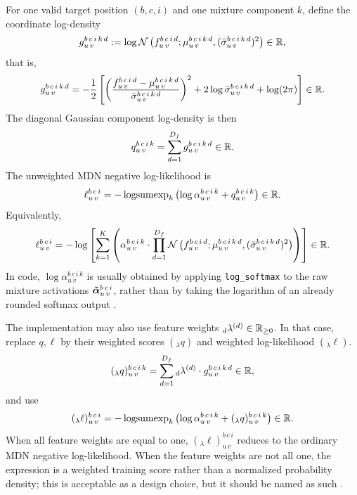 For one valid target position $(b,c,i)$ and one mixture component $k$, define
the coordinate log-density
\[
  g_{u\,v}^{b\,c\,i\,k\,d}
  :=
  \log
  \mathcal{N}
  \left(
    f_{u\,v}^{b\,c\,i\,d};
    \mu_{u\,v}^{b\,c\,i\,k\,d},
    (\bar{\sigma}_{u\,v}^{b\,c\,i\,k\,d})^{2}
  \right)
  \in\mathbb{R},
\]
that is,
\[
  g_{u\,v}^{b\,c\,i\,k\,d}
  =
  -\frac{1}{2}
  \left[
    \left(
      \frac{
        f_{u\,v}^{b\,c\,i\,d}-\mu_{u\,v}^{b\,c\,i\,k\,d}
      }{
        \bar{\sigma}_{u\,v}^{b\,c\,i\,k\,d}
      }
    \right)^{2}
    +
    2\log \bar{\sigma}_{u\,v}^{b\,c\,i\,k\,d}
    +
    \log(2\pi)
  \right]
  \in\mathbb{R}.
\]
The diagonal Gaussian component log-density is then
\[
  q_{u\,v}^{b\,c\,i\,k}
  =
  \sum_{d=1}^{D_f} g_{u\,v}^{b\,c\,i\,k\,d}
  \in\mathbb{R}.
\]
The unweighted MDN negative log-likelihood is
\[
  \ell_{u\,v}^{b\,c\,i}
  =
  -
  \operatorname{logsumexp}_{k}
  \left(
    \log \alpha_{u\,v}^{b\,c\,i\,k}
    +
    q_{u\,v}^{b\,c\,i\,k}
  \right)
  \in\mathbb{R}.
\]
Equivalently,
\[
  \ell_{u\,v}^{b\,c\,i}
  =
  -
  \log
  \left[
    \sum_{k=1}^{K}
      \left(
      \alpha_{u\,v}^{b\,c\,i\,k}
      \cdot
        \prod_{d=1}^{D_f}
        \mathcal{N}
        \left(
          f_{u\,v}^{b\,c\,i\,d};
          \mu_{u\,v}^{b\,c\,i\,k\,d},
          (\bar{\sigma}_{u\,v}^{b\,c\,i\,k\,d})^{2}
        \right)
      \right)
  \right]
  \in\mathbb{R}.
\]
In code, $\log\alpha_{u\,v}^{b\,c\,i\,k}$ is usually obtained by applying
\texttt{log\_softmax} to the raw mixture activations
$\bm{\tilde{\alpha}}_{u\,v}^{b\,c\,i}$, rather than by taking the logarithm of an
already rounded softmax output%
.

The implementation may also use feature weights
${}_{d}\lambda^{(d)}\in\mathbb{R}_{\ge 0}$.  In that case, replace $q, \ell$ by their
weighted scores $({}_{\lambda}q)$ and weighted log-likelihood
$({}_{\lambda}\ell)$.
\[
  ({}_{\lambda}q)_{u\,v}^{b\,c\,i\,k}
  =
  \sum_{d=1}^{D_f}
  {}_{d}\lambda^{(d)}\cdot g_{u\,v}^{b\,c\,i\,k\,d}
  \in\mathbb{R},
\]
and use
\[
  ({}_{\lambda}\ell)_{u\,v}^{b\,c\,i}
  =
  -
  \operatorname{logsumexp}_{k}
  \left(
    \log \alpha_{u\,v}^{b\,c\,i\,k}
    +
    ({}_{\lambda}q)_{u\,v}^{b\,c\,i\,k}
  \right)
  \in\mathbb{R}.
\]
When all feature weights are equal to one,
$({}_{\lambda}\ell)_{u\,v}^{b\,c\,i}$ reduces to the ordinary MDN negative
log-likelihood.  When the feature weights are not all one, the expression is a
weighted training score rather than a normalized probability density; this is
acceptable as a design choice, but it should be named as such%
.

